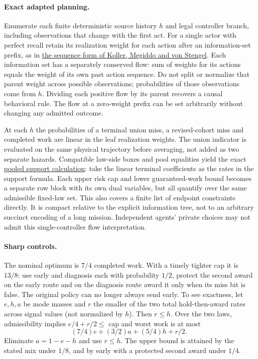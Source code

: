 \documentclass[11pt]{article}
\begin{document}
\paragraph{Exact adapted planning.}
Enumerate each finite deterministic source history $h$ and legal controller branch, including observations that change with the first act. For a single actor with perfect recall retain its realization weight for each action after an information-set prefix, as in \href{https://ai.stanford.edu/~koller/Papers/Koller%2Bal%3AGEB96.pdf}{the sequence form of Koller, Megiddo and von Stengel}. Each information set has a separately conserved flow: sum of weights for its actions equals the weight of its own past action sequence. Do not split or normalize that parent weight across possible observations; probabilities of those observations come from $h$. Dividing each positive flow by its parent recovers a causal behavioral rule. The flow at a zero-weight prefix can be set arbitrarily without changing any admitted outcome.

At each $h$ the probabilities of a terminal union miss, a revised-cohort miss and completed work are linear in the leaf realization weights. The union indicator is evaluated on the same physical trajectory before averaging, not added as two separate hazards. Compatible law-side boxes and pool equalities yield the exact \href{https://github.com/eternal-november/eos-research-programmes/pull/421}{pooled support calculation}: take the linear terminal coefficients as the rates in the support formula. Each upper risk cap and lower guaranteed-work bound becomes a separate row block with its own dual variables, but all quantify over the same admissible fixed-law set. This also covers a finite list of endpoint constraints directly. It is compact relative to the explicit information tree, not to an arbitrary succinct encoding of a long mission. Independent agents' private choices may not admit this single-controller flow interpretation.

\paragraph{Sharp controls.}
The nominal optimum is $7/4$ completed work. With a timely tighter cap it is $13/8$: use early and diagnosis each with probability $1/2$, protect the second award on the early route and on the diagnosis route award it only when its miss bit is false. The original policy can no longer always send early. To see exactness, let $e,h,a$ be mode masses and $r$ the smaller of the two total hold-then-award rates across signal values (not normalized by $h$). Then $r\leq h$. Over the two laws, admissibility implies $e/4+r/2\leq$ cap and worst work is at most
\[
 (7/4)e+(3/2)a+(5/4)h+r/2.
\]
Eliminate $a=1-e-h$ and use $r\leq h$. The upper bound is attained by the stated mix under $1/8$, and by early with a protected second award under $1/4$.
\end{document}
